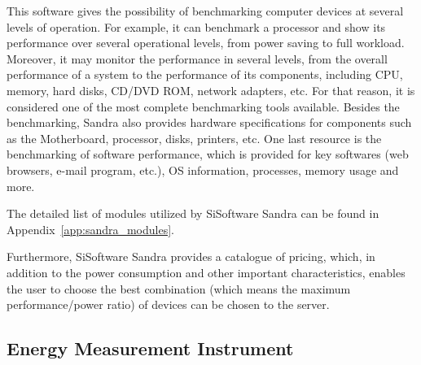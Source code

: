     This software gives the possibility of benchmarking computer devices at several levels of operation. For example, it can benchmark a processor and show its performance over several operational levels, from power saving to full workload. Moreover, it may monitor the performance in several levels, from the overall performance of a system to the performance of its components, including CPU, memory, hard disks, CD/DVD ROM, network adapters, etc. For that reason, it is considered one of the most complete benchmarking tools available. Besides the benchmarking, Sandra also provides hardware specifications for components such as the Motherboard, processor, disks, printers, etc. One last resource is the benchmarking of software performance, which is provided for key softwares (web browsers, e-mail program, etc.), OS information, processes, memory usage and more.
    
    The detailed list of modules utilized by SiSoftware Sandra can be found in Appendix~\ref{app:sandra_modules}.
    
    Furthermore, SiSoftware Sandra provides a catalogue of pricing, which, in addition to the power consumption and other important characteristics, enables the user to choose the best combination (which means the maximum performance/power ratio) of devices can be chosen to the server.
    
    \subsection{Energy Measurement Instrument} \label{sec3:energy_measurement_instrument}


